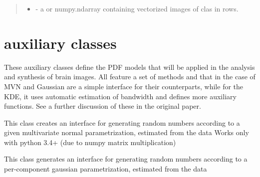 \documentclass[letterpaper,10pt,english]{sphinxmanual}
\begin{document}
\begin{fulllineitems}
\begin{fulllineitems}
\begin{quote}
\begin{description}
\begin{itemize}
\item {} 
 - a  or numpy.ndarray containing              vectorized images of clas  in rows.

\end{itemize}


\end{description}\end{quote}

\end{fulllineitems}


\end{fulllineitems}



\section{auxiliary classes}
\label{\detokenize{api:auxiliary-classes}}
These auxiliary classes define the PDF models that will be applied in the analysis and synthesis of brain images. All feature a set of methods  and  that in the case of MVN and Gaussian are a simple interface for their  counterparts, while for the KDE, it uses automatic estimation of bandwidth and defines more auxiliary functions. See a further discussion of these in the original paper.

\begin{fulllineitems}
\label{\detokenize{api:brainSimulator.MVNormalEstimator}}
This class creates an interface for generating random numbers according
to a given multivariate normal parametrization, estimated from the data
Works only with python 3.4+ (due to numpy matrix multiplication)

\end{fulllineitems}


\begin{fulllineitems}
\label{\detokenize{api:brainSimulator.GaussianEstimator}}
This class generates an interface for generating random numbers according
to a per-component gaussian parametrization, estimated from the data

\end{fulllineitems}
\end{document}
